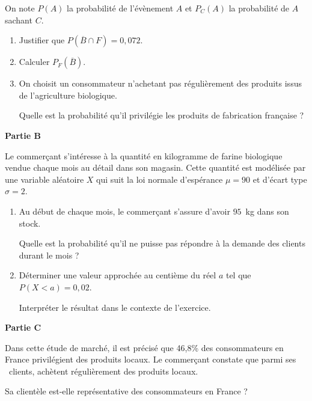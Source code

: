\documentclass[10pt,a4paper]{article}
\begin{document}
On note $P(A)$ la probabilité de l'évènement $A$ et $P_C(A)$ la probabilité de $A$ sachant $C$.

\medskip

\begin{enumerate}
\item Justifier que $P\left(\overline{B} \cap F\right) = 0,072$.
\item Calculer $P_F\left(\overline{B}\right)$.
\item On choisit un consommateur n'achetant pas régulièrement des produits issus de l'agriculture biologique.

Quelle est la probabilité qu'il privilégie les produits de fabrication française ?
\end{enumerate}

\bigskip

\textbf{Partie B}

\medskip

Le commerçant s'intéresse à la quantité en kilogramme de farine biologique vendue chaque mois au détail dans son magasin. Cette quantité est modélisée par une variable aléatoire $X$ qui
suit la loi normale d'espérance $\mu = 90$ et d'écart type $\sigma = 2$.

\medskip

\begin{enumerate}
\item Au début de chaque mois, le commerçant s'assure d'avoir $95$~kg dans son stock.

Quelle est la probabilité qu'il ne puisse pas répondre à la demande des clients durant le mois ?
\item Déterminer une valeur approchée au centième du réel $a$ tel que $P(X < a) = 0,02$.

Interpréter le résultat dans le contexte de l'exercice.
\end{enumerate}

\bigskip

\textbf{Partie C}

\medskip

Dans cette étude de marché, il est précisé que 46,8\:\% des consommateurs en France privilégient des produits locaux. Le commerçant constate que parmi ses ~clients, 
achètent régulièrement des produits locaux.

Sa clientèle est-elle représentative des consommateurs en France ?
\end{document}
